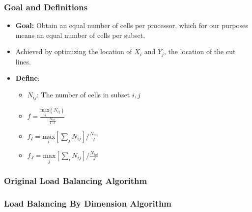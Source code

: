 \documentclass[compress]{beamer}
\begin{document}
\begin{frame}[t]\frametitle{ Goal and Definitions}
	\begin{block}{}
	
		\begin{itemize}
			\item \textbf{Goal:} Obtain an equal number of cells per processor, which for our purposes means an equal number of cells per subset.
			\item Achieved by optimizing the location of $X_i$ and $Y_j$, the location of the cut lines.
			\item \textbf{Define}:
			\begin{itemize}
			\item $N_{ij}$: The number of cells  in subset ${i,j}$
			\item $f =\frac{\underset{ij}{\text{max}}(N_{ij})}{\frac{N_{tot}}{I\cdot J}}$
			\item $f_I = \underset{i}{\text{max}}[\sum_{j} N_{ij}]/\frac{N_{tot}}{I}$
			\item $f_J = \underset{j}{\text{max}}[\sum_{i} N_{ij}]/\frac{N_{tot}}{J}$
			\end{itemize}
		\end{itemize}
	\end{block}
\end{frame}

\begin{frame}[t]\frametitle{Original Load Balancing Algorithm}
\vspace{-0.5 cm}
\begin{block}{}

\end{block}
\end{frame}

\begin{frame}[t]\frametitle{Load Balancing By Dimension Algorithm}
\vspace{-0.5 cm}
\begin{block}{}

\end{block}
\end{frame}
\end{document}
